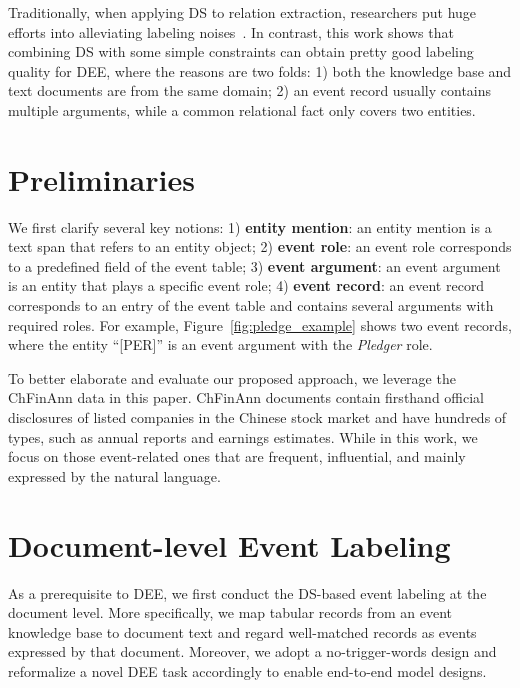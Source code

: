 \documentclass[11pt,a4paper]{article}
\begin{document}
Traditionally, when applying DS to relation extraction, researchers put huge efforts into alleviating labeling noises~\cite{riedel2010modeling,lin2016neural,feng2018reinforcement,zheng2019diagnre}.
In contrast, this work shows that combining DS with some simple constraints can obtain pretty good labeling quality for DEE, where the reasons are two folds:
1) both the knowledge base and text documents are from the same domain;
2) an event record usually contains multiple arguments, while a common relational fact only covers two entities.





\section{Preliminaries}

We first clarify several key notions:
1) \textbf{entity mention}:
an entity mention is a text span that refers to an entity object;
2) \textbf{event role}:
an event role corresponds to a predefined field of the event table;
3) \textbf{event argument}:
an event argument is an entity that plays a specific event role;
4) \textbf{event record}:
an event record corresponds to an entry of the event table and contains several arguments with required roles.
For example, Figure~\ref{fig:pledge_example} shows two event records, where the entity ``[PER]'' is an event argument with the \textit{Pledger} role.

To better elaborate and evaluate our proposed approach, we leverage the ChFinAnn data in this paper.
ChFinAnn documents contain firsthand official disclosures of listed companies in the Chinese stock market and have hundreds of types, such as annual reports and earnings estimates.
While in this work, we focus on those event-related ones that are frequent, influential, and mainly expressed by the natural language.


\section{Document-level Event Labeling}
\label{sec:doc_event_labeling}

As a prerequisite to DEE, we first conduct the DS-based event labeling at the document level.
More specifically, we map tabular records from an event knowledge base to document text and regard well-matched records as events expressed by that document.
Moreover, we adopt a no-trigger-words design and reformalize a novel DEE task accordingly to enable end-to-end model designs.
\end{document}
